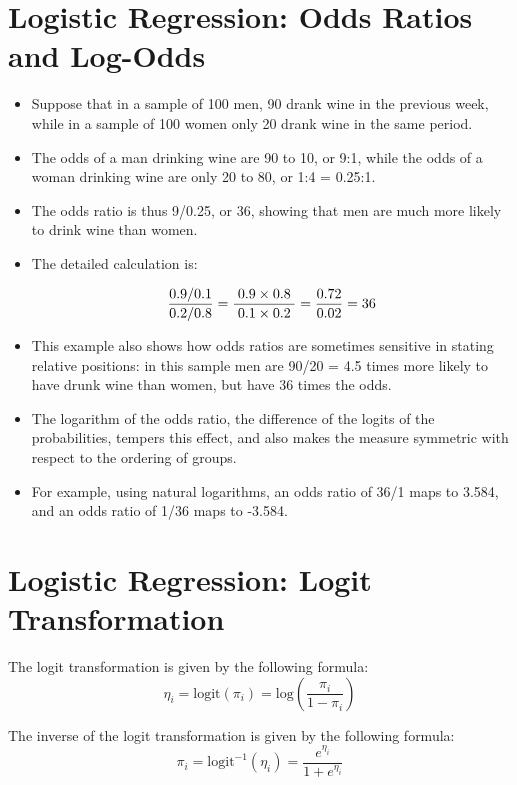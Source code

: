 \documentclass[12pt, a4paper]{article}
\theoremstyle{plain}
\theoremstyle{definition}
\theoremstyle{remark}
\begin{document}


\section{Logistic Regression: Odds Ratios and Log-Odds}
\begin{itemize}
	\item Suppose that in a sample of 100 men, 90 drank wine in the previous week, while in a sample of 100 women only 20 drank wine in the same period. \item The odds of a man drinking wine are 90 to 10, or 9:1, while the odds of a woman drinking wine are only 20 to 80, or 1:4 = 0.25:1. 
	\item The odds ratio is thus 9/0.25, or 36, showing that men are much more likely to drink wine than women. 
	\item The detailed calculation is:
	
	
	\[ { 0.9/0.1 \over 0.2/0.8}=\frac{\;0.9\times 0.8\;}{\;0.1\times 0.2\;} ={0.72 \over 0.02} = 36 \]
	
	\item This example also shows how odds ratios are sometimes sensitive in stating relative positions: in this sample men are 90/20 = 4.5 times more likely to have drunk wine than women, but have 36 times the odds. 
	
	
	
	\item The logarithm of the odds ratio, the difference of the logits of the probabilities, tempers this effect, and also makes the measure symmetric with respect to the ordering of groups. 
	\item For example, using natural logarithms, an odds ratio of 36/1 maps to 3.584, and an odds ratio of 1/36 maps to -3.584.
\end{itemize}


\section*{Logistic Regression: Logit Transformation}

The logit transformation is given by the following formula: 
\[ \eta_i = \mbox{logit}(\pi_i)  = \mbox{log}\left( \frac{\pi_i}{1- \pi_i} \right) \]

\noindent 
The inverse of the logit transformation is given by the following formula: 
\[ \pi_i = \mbox{logit}^{-1}(\eta_i)  =  \frac{e^{\eta_i}}{1 + e^{\eta_i}} \]
\end{document}
